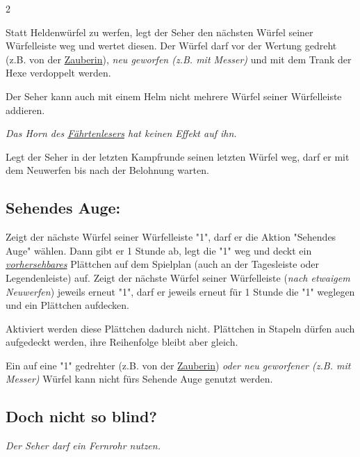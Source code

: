 \documentclass[10pt, a4paper, oneside]{book}
\newcommand{\fan}[1]{\textit{#1}}
\begin{document}
\begin{multicols*}{2}
\begin{nobgcolor}
Statt Heldenwürfel zu werfen, legt der Seher den nächsten Würfel seiner Würfelleiste weg und wertet diesen. Der Würfel darf vor der Wertung gedreht (z.B. von der \hyperref[Zauberin]{Zauberin})\supercite{DH:FAQ}, \fan{neu geworfen (z.B. mit Messer)} und mit dem Trank der Hexe verdoppelt werden.

Der Seher kann auch mit einem Helm nicht mehrere Würfel seiner Würfelleiste addieren.
\supercite{DH:FAQ,DH:Begleitheft}

\fan{Das Horn des \hyperref[Fährtenleser]{Fährtenlesers} hat keinen Effekt auf ihn.}

Legt der Seher in der letzten Kampfrunde seinen letzten Würfel weg, darf er mit dem Neuwerfen bis nach der Belohnung warten.
\supercite{DH:FAQ,DH:Begleitheft}













\subsection{Sehendes Auge:}

Zeigt der nächste Würfel seiner Würfelleiste "1", darf er die Aktion "Sehendes Auge" wählen. Dann gibt er 1 Stunde ab, legt die "1" weg und deckt ein \hyperref[Aufdecken]{\fan{vorhersehbares}} Plättchen auf dem Spielplan (auch an der Tagesleiste oder Legendenleiste) auf. Zeigt der nächste Würfel seiner Würfelleiste (\fan{nach etwaigem Neuwerfen}) jeweils erneut "1", darf er jeweils erneut für 1 Stunde die "1" weglegen und ein Plättchen aufdecken.\supercite{46520}

Aktiviert werden diese Plättchen dadurch nicht. Plättchen in Stapeln dürfen auch aufgedeckt werden, ihre Reihenfolge bleibt aber gleich.
\supercite{BL_BdM:A3_en}

Ein auf eine "1" gedrehter (z.B. von der \hyperref[Zauberin]{Zauberin}) \fan{oder neu geworfener (z.B. mit Messer)} Würfel kann nicht fürs Sehende Auge genutzt werden.
\supercite{DH:FAQ}



\subsection{Doch nicht so blind?}

\fan{Der Seher darf ein Fernrohr nutzen.}



\end{nobgcolor}
\end{multicols*}
\end{document}

